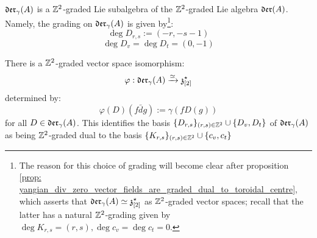         \begin{corollary} \label{coro: yangian_div_zero_vector_fields_are_graded}
            $\mathfrak{der}_{\gamma}(A)$ is a $\mathbb{Z}^2$-graded Lie subalgebra of the $\mathbb{Z}^2$-graded Lie algebra $\mathfrak{der}(A)$. Namely, the grading on $\mathfrak{der}_{\gamma}(A)$ is given by\footnote{The reason for this choice of grading will become clear after proposition \ref{prop: yangian_div_zero_vector_fields_are_graded_dual_to_toroidal_centre}, which asserts that $\mathfrak{der}_{\gamma}(A) \simeq \mathfrak{z}_{[2]}^{\star}$ as $\mathbb{Z}^2$-graded vector spaces; recall that the latter has a natural $\mathbb{Z}^2$-grading given by $\deg K_{r, s} = (r, s), \deg c_v = \deg c_t = 0$.}:
                $$\deg D_{r, s} := (-r, -s - 1)$$
                $$\deg D_v = \deg D_t = (0, -1)$$
        \end{corollary}
        \begin{proposition} \label{prop: yangian_div_zero_vector_fields_are_graded_dual_to_toroidal_centre}
            There is a $\mathbb{Z}^2$-graded vector space isomorphism:
                $$\varphi: \mathfrak{der}_{\gamma}(A) \xrightarrow[]{\simeq} \mathfrak{z}_{[2]}^{\star}$$
            determined by:
                $$\varphi(D)( f\bar{d}g ) := \gamma( f D(g) )$$
            for all $D \in \mathfrak{der}_{\gamma}(A)$. This identifies the basis $\{D_{r, s}\}_{(r, s) \in \mathbb{Z}^2} \cup \{D_v, D_t\}$ of $\mathfrak{der}_{\gamma}(A)$ as being $\mathbb{Z}^2$-graded dual to the basis $\{K_{r, s}\}_{(r, s) \in \mathbb{Z}^2} \cup \{c_v, c_t\}$
        \end{proposition}
